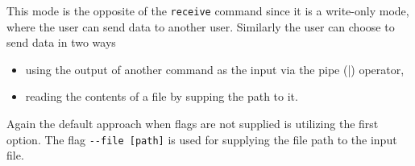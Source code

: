 This mode is the opposite of the \texttt{receive} command since it is a write-only mode, where the user can send data to another user. Similarly the user can choose to send data in two ways
\begin{itemize}
  \item using the output of another command as the input via the pipe (|) operator,
  \item reading the contents of a file by supping the path to it.
\end{itemize}
Again the default approach when flags are not supplied is utilizing the first option. The flag \texttt{-\--file [path]} is used for supplying the file path to the input file.